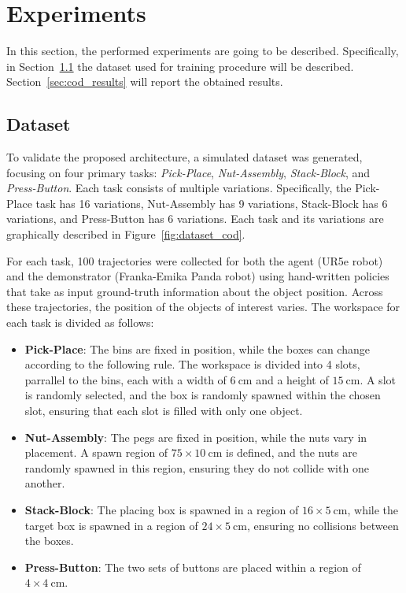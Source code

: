 \section{Experiments}
\label{sec:cod_experimental}
In this section, the performed experiments are going to be described. Specifically, in  
Section~\ref{sec:cod_dataset} the dataset used for training procedure will be described. Section~\ref{sec:cod_results} will report the obtained results.
\subsection{Dataset}
\label{sec:cod_dataset}
To validate the proposed architecture, a simulated dataset was generated, focusing on four primary tasks: \textit{Pick-Place}, \textit{Nut-Assembly}, \textit{Stack-Block}, and \textit{Press-Button}. Each task consists of multiple variations. Specifically, the Pick-Place task has 16 variations, Nut-Assembly has 9 variations, Stack-Block has 6 variations, and Press-Button has 6 variations. Each task and its variations are graphically described in Figure~\ref{fig:dataset_cod}.


For each task, 100 trajectories were collected for both the agent (UR5e robot) and the demonstrator (Franka-Emika Panda robot) using hand-written policies that take as input ground-truth information about the object position. Across these trajectories, the position of the objects of interest varies. The workspace for each task is divided as follows:
\begin{itemize}
    \item \textbf{Pick-Place}: The bins are fixed in position, while the boxes can change according to the following rule. The workspace is divided into 4 slots, parrallel to the bins, each with a width of $6 \ \text{cm}$ and a height of $15 \ \text{cm}$. A slot is randomly selected, and the box is randomly spawned within the chosen slot, ensuring that each slot is filled with only one object.
    \item \textbf{Nut-Assembly}: The pegs are fixed in position, while the nuts vary in placement. A spawn region of $75 \times 10 \ \text{cm}$ is defined, and the nuts are randomly spawned in this region, ensuring they do not collide with one another.
    \item \textbf{Stack-Block}: The placing box is spawned in a region of $16 \times 5 \ \text{cm}$, while the target box is spawned in a region of $24 \times 5 \ \text{cm}$, ensuring no collisions between the boxes.
    \item \textbf{Press-Button}: The two sets of buttons are placed within a region of $4 \times 4 \ \text{cm}$.
\end{itemize}

